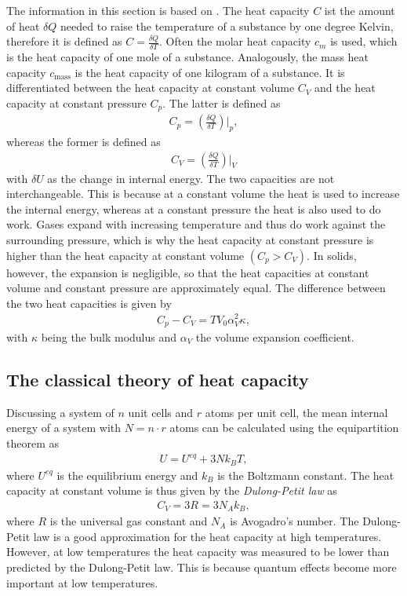 The information in this section is based on \cite{GrossMarx+2014}. \newline
The heat capacity $C$ ist the amount of heat $\delta Q$ needed to raise the temperature of a substance by one degree Kelvin, therefore it is defined as $C = \frac{\delta Q}{\delta T}$.
Often the molar heat capacity $c_m$ is used, which is the heat capacity of one mole of a substance.
Analogously, the mass heat capacity $c_{\text{mass}}$ is the heat capacity of one kilogram of a substance.
It is differentiated between the heat capacity at constant volume $C_V$ and the heat capacity at constant pressure $C_p$.
The latter is defined as 
\begin{align}
    C_p = \left(\frac{\delta Q}{\delta T}\right)\Big|_p,
    \label{eq:cp}
\end{align}
whereas the former is defined as
\begin{align}
    C_V = \left(\frac{\delta Q}{\delta T}\right)\Big|_V
    \label{eq:cv}
\end{align}
with $\delta U$ as the change in internal energy.
The two capacities are not interchangeable.
This is because at a constant volume the heat is used to increase the internal energy, whereas at a constant pressure the heat is also used to do work.
Gases expand with increasing temperature and thus do work against the surrounding pressure, which is why the heat capacity at constant pressure is higher than the heat capacity at constant volume $(C_p>C_V)$.
In solids, however, the expansion is negligible, so that the heat capacities at constant volume and constant pressure are approximately equal.
The difference between the two heat capacities is given by
\begin{align}
    C_p-C_V=T V_0 \alpha^2_V \kappa,
    \label{eq:cp-cv}
\end{align}
with $\kappa$ being the bulk modulus and $\alpha_V$ the volume expansion coefficient.

\subsection{The classical theory of heat capacity}
\label{sec:classical}

Discussing a system of $n$ unit cells and $r$ atoms per unit cell, the mean internal energy of a system with $N=n\cdot r$ atoms can be calculated using the equipartition theorem as
\begin{align}
    U = U^{eq} + 3Nk_B T,
    \label{eq:U}
\end{align}
where $U^{eq}$ is the equilibrium energy and $k_B$ is the Boltzmann constant.
The heat capacity at constant volume is thus given by the \textit{Dulong-Petit law} as
\begin{align}
    C_V = 3R = 3N_A k_B,
    \label{eq:dulong-petit}
\end{align}
where $R$ is the universal gas constant and $N_A$ is Avogadro's number.\newline
The Dulong-Petit law is a good approximation for the heat capacity at high temperatures.
However, at low temperatures the heat capacity was measured to be lower than predicted by the Dulong-Petit law.
This is because quantum effects become more important at low temperatures.

